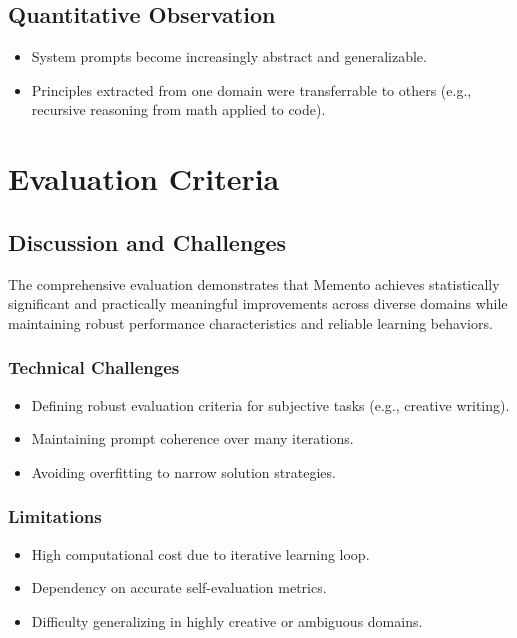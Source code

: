 \documentclass[10pt,a4paper,twocolumn]{article}
\begin{document}
\subsection{Quantitative Observation}


\begin{itemize}
    \item System prompts become increasingly abstract and generalizable.
    \item Principles extracted from one domain were transferrable to others (e.g., recursive reasoning from math applied to code).
\end{itemize}







\section{Evaluation Criteria} 


\subsection{Discussion and Challenges}

The comprehensive evaluation demonstrates that Memento achieves statistically significant and practically meaningful improvements across diverse domains while maintaining robust performance characteristics and reliable learning behaviors.


\subsubsection{Technical Challenges}



\begin{itemize}
    \item Defining robust evaluation criteria for subjective tasks (e.g., creative writing).
    \item Maintaining prompt coherence over many iterations.
    \item Avoiding overfitting to narrow solution strategies.
\end{itemize}



\subsubsection{Limitations}


\begin{itemize}
    \item High computational cost due to iterative learning loop.
    \item Dependency on accurate self-evaluation metrics.
    \item Difficulty generalizing in highly creative or ambiguous domains.

\end{itemize}
\end{document}

